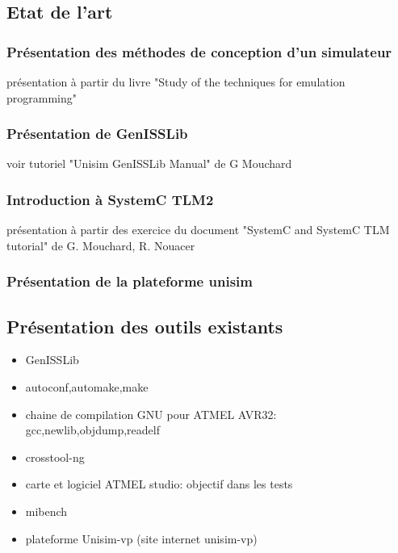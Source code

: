 \subsection{Etat de l'art}

\subsubsection{Présentation des méthodes de conception d'un simulateur}

présentation à partir du livre "Study of the techniques for emulation programming"

\subsubsection{Présentation de GenISSLib}

voir tutoriel "Unisim GenISSLib Manual" de G Mouchard 

 \subsubsection{Introduction à SystemC TLM2}

présentation à partir des exercice du document "SystemC and SystemC TLM tutorial" de G. Mouchard, R. Nouacer
 
\subsubsection{Présentation de la plateforme unisim}

\subsection{Présentation des outils existants}

\begin{itemize}
\item GenISSLib
\item autoconf,automake,make
\item chaine de compilation GNU pour ATMEL AVR32: gcc,newlib,objdump,readelf
\item crosstool-ng
\item carte et logiciel ATMEL studio: objectif dans les tests
\item mibench
\item plateforme Unisim-vp (site internet unisim-vp)
	
\end{itemize}

